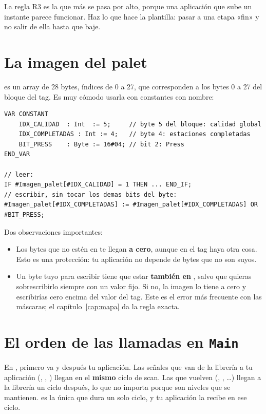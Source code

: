 \begin{ojo}
La regla R3 es la que más se pasa por alto, porque una aplicación que sube  un instante parece funcionar. Haz lo que hace la plantilla: pasar a una etapa «fin» y no salir de ella hasta que  baje.
\end{ojo}

\section{La imagen del palet}\label{sec:imagen}
 es un array de 28 bytes, índices de 0 a 27, que corresponden a los bytes 0 a 27 del bloque del tag. Es muy cómodo usarla con constantes con nombre:

\begin{lstlisting}[caption={Cómo se usa la imagen en una aplicación (extracto de la plantilla).}]
VAR CONSTANT
    IDX_CALIDAD  : Int  := 5;     // byte 5 del bloque: calidad global
    IDX_COMPLETADAS : Int := 4;   // byte 4: estaciones completadas
    BIT_PRESS    : Byte := 16#04; // bit 2: Press
END_VAR

// leer:
IF #Imagen_palet[#IDX_CALIDAD] = 1 THEN ... END_IF;
// escribir, sin tocar los demas bits del byte:
#Imagen_palet[#IDX_COMPLETADAS] := #Imagen_palet[#IDX_COMPLETADAS] OR #BIT_PRESS;
\end{lstlisting}

Dos observaciones importantes:
\begin{itemize}
\item Los bytes que no estén en  te llegan \textbf{a cero}, aunque en el tag haya otra cosa. Esto es una protección: tu aplicación no depende de bytes que no son suyos.
\item Un byte tuyo para escribir tiene que estar \textbf{también en }, salvo que quieras sobrescribirlo siempre con un valor fijo. Si no, la imagen lo tiene a cero y escribirías cero encima del valor del tag. Este es el error más frecuente con las máscaras; el capítulo~\ref{cap:mapa} da la regla exacta.
\end{itemize}

\section{El orden de las llamadas en \texttt{Main}}
En , primero va  y después tu aplicación. Las señales que van de la librería a tu aplicación (, , ) llegan en el \textbf{mismo} ciclo de scan. Las que vuelven (, , \dots) llegan a la librería un ciclo después, lo que no importa porque son niveles que se mantienen.  es la única que dura un solo ciclo, y tu aplicación la recibe en ese ciclo.

